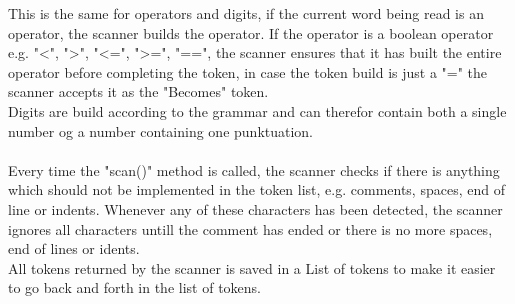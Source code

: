This is the same for operators and digits, if the current word being read is an operator, the scanner builds the operator. If the operator is a boolean operator e.g. "<", ">", "<=", ">=", "==", the scanner ensures that it has built the entire operator before completing the token, in case the token build is just a "=" the scanner accepts it as the "Becomes" token.\\
Digits are build according to the grammar and can therefor contain both a single number og a number containing one punktuation.\\
\\
Every time the "scan()" method is called, the scanner checks if there is anything which should not be implemented in the token list, e.g. comments, spaces, end of line or indents. Whenever any of these characters has been detected, the scanner ignores all characters untill the comment has ended or there is no more spaces, end of lines or idents.\\
All tokens returned by the scanner is saved in a List of tokens to make it easier to go back and forth in the list of tokens.\\
